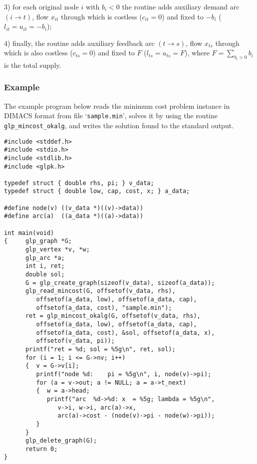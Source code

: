 3) for each original node $i$ with $b_i<0$ the routine adds auxiliary
demand arc $(i\rightarrow t)$, flow $x_{it}$ through which is costless
($c_{it}=0$) and fixed to $-b_i$ ($l_{it}=u_{it}=-b_i$);

4) finally, the routine adds auxiliary feedback arc $(t\rightarrow s)$,
flow $x_{ts}$ through which is also costless ($c_{ts}=0$) and fixed to
$F$ ($l_{ts}=u_{ts}=F$), where $\displaystyle F=\sum_{b_i>0}b_i$ is the
total supply.

\subsubsection*{Example}

The example program below reads the minimum cost problem instance in
DIMACS format from file `\verb|sample.min|', solves it by using the
routine \verb|glp_mincost_okalg|, and writes the solution found to the
standard output.

\begin{footnotesize}
\begin{verbatim}
#include <stddef.h>
#include <stdio.h>
#include <stdlib.h>
#include <glpk.h>

typedef struct { double rhs, pi; } v_data;
typedef struct { double low, cap, cost, x; } a_data;

#define node(v) ((v_data *)((v)->data))
#define arc(a)  ((a_data *)((a)->data))

int main(void)
{     glp_graph *G;
      glp_vertex *v, *w;
      glp_arc *a;
      int i, ret;
      double sol;
      G = glp_create_graph(sizeof(v_data), sizeof(a_data));
      glp_read_mincost(G, offsetof(v_data, rhs),
         offsetof(a_data, low), offsetof(a_data, cap),
         offsetof(a_data, cost), "sample.min");
      ret = glp_mincost_okalg(G, offsetof(v_data, rhs),
         offsetof(a_data, low), offsetof(a_data, cap),
         offsetof(a_data, cost), &sol, offsetof(a_data, x),
         offsetof(v_data, pi));
      printf("ret = %d; sol = %5g\n", ret, sol);
      for (i = 1; i <= G->nv; i++)
      {  v = G->v[i];
         printf("node %d:    pi = %5g\n", i, node(v)->pi);
         for (a = v->out; a != NULL; a = a->t_next)
         {  w = a->head;
            printf("arc  %d->%d: x  = %5g; lambda = %5g\n",
               v->i, w->i, arc(a)->x,
               arc(a)->cost - (node(v)->pi - node(w)->pi));
         }
      }
      glp_delete_graph(G);
      return 0;
}
\end{verbatim}
\end{footnotesize}

